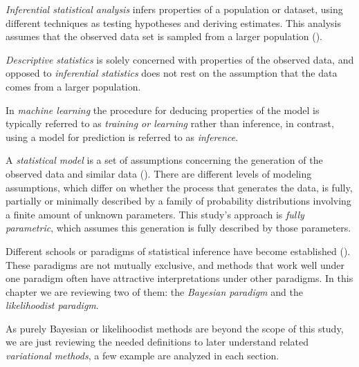 
\emph{Inferential statistical analysis} infers properties of a population or dataset, using different techniques as testing hypotheses and deriving estimates. This analysis assumes that the observed data set is sampled from a larger population (\cite{upton2014dictionary}).

\emph{Descriptive statistics} is solely concerned with properties of the observed data, and opposed to \emph{inferential statistics} does not rest on the assumption that the data comes from a larger population.

In \emph{machine learning} the procedure for deducing properties of the model is typically referred to as \emph{training or learning} rather than inference, in contrast, using a model for prediction is referred to as \emph{inference}.

A \emph{statistical model} is a set of assumptions concerning the generation of the observed data and similar data (\cite{cox2006principles}). There are different levels of modeling assumptions, which differ on whether the process that generates the data, is fully, partially or minimally described by a family of probability distributions involving a finite amount of unknown parameters. This study's approach is \emph{fully parametric}, which assumes this generation is fully described by those parameters.

Different schools or paradigms of statistical inference have become established (\cite{bandyopadhyay2011philosophy}). These paradigms are not mutually exclusive, and methods that work well under one paradigm often have attractive interpretations under other paradigms. In this chapter we are reviewing two of them: the \emph{Bayesian paradigm} and the \emph{likelihoodist paradigm}.

As purely Bayesian or likelihoodist methods are beyond the scope of this study, we are just reviewing the needed definitions to later understand related \emph{variational methods}, a few example are analyzed in each section.
